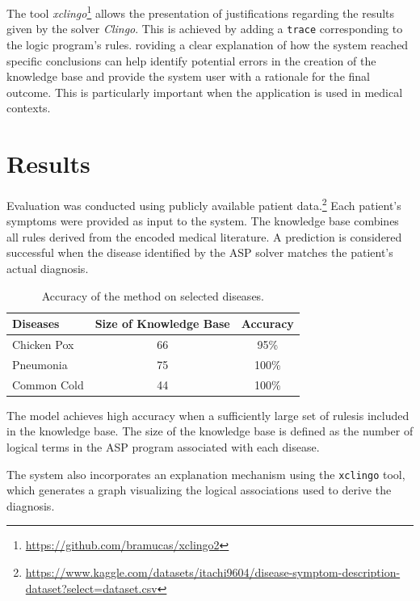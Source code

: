 \documentclass[10pt,leqno]{amsart}
\newcommand{\src}[1]{\texttt{#1}}
\begin{document}
The tool \textit{xclingo}\footnote{\url{https://github.com/bramucas/xclingo2}} \cite{Cabalar_2020} 
allows the presentation of justifications regarding the results given by the solver \textit{Clingo}. 
This is achieved by adding a \src{trace} corresponding to the logic program's rules. 
roviding a clear explanation of how the system reached specific conclusions can help identify potential 
errors in the creation of the knowledge base and provide the system user with a rationale for the final outcome. 
This is particularly important when the application is used in medical contexts.

\section{Results}

Evaluation was conducted using publicly available patient data.\footnote{\url{https://www.kaggle.com/datasets/itachi9604/disease-symptom-description-dataset?select=dataset.csv}} 
Each patient's symptoms were provided as input to the system. 
The knowledge base combines all rules derived from the encoded medical literature. 
A prediction is considered successful when the disease identified by the ASP solver matches the patient’s actual diagnosis.
\begin{table}[h]
    \centering
    \begin{tabular}{lcc}
    \hline
    Diseases & Size of Knowledge Base & Accuracy \\
    \hline
    \hline
    Chicken Pox      &  66  & 95\% \\
    Pneumonia        &  75  & 100\% \\
    Common Cold    &   44 & 100\% \\
    \hline
    \end{tabular}
    \caption{Accuracy of the method on selected diseases.}
\end{table}

The model achieves high accuracy when a sufficiently 
large set of rulesis included in the knowledge base. 
The size of the knowledge base is defined as the number 
of logical terms in the ASP program associated with each disease.

The system also incorporates an explanation mechanism using the \src{xclingo} tool,
which generates a graph visualizing the logical associations used to derive the diagnosis.
\end{document}
